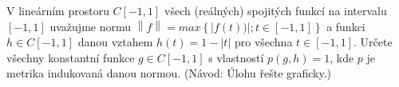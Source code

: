 V lineárním prostoru $C\left [ -1,1 \right ]$ všech (reálných) spojitých funkcí
na intervalu $\left [ -1,1 \right ]$ uvažujme normu $\left \| f \right
\|=max\left \{ \left | f(t)) \right |;t \in \left [ -1,1 \right ] \right \}$ a
funkci $h \in C\left [ -1,1 \right ]$ danou vztahem $h(t) = 1 - \left | t
\right |$ pro všechna $ t \in \left [ -1,1 \right ]$. Určete všechny konstantní
funkce $g \in C\left [ -1,1 \right ]$ s vlastností $p\left ( g,h \right )=1$,
kde $p$ je metrika indukovaná danou normou. (Návod: Úlohu řešte graficky.)
